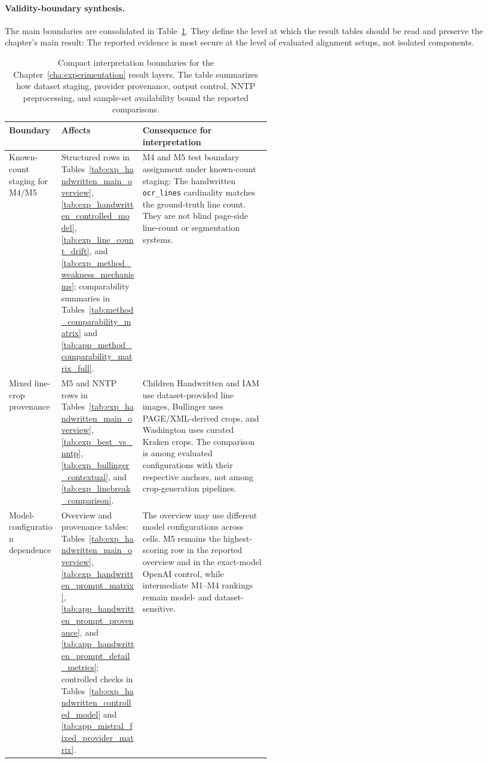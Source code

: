 \paragraph{Validity-boundary synthesis.}
The main boundaries are consolidated in Table~\ref{tab:exp_validity_boundaries}. They define the level at which the result tables should be read and preserve the chapter's main result: The reported evidence is most secure at the level of evaluated alignment setups, not isolated components.

\begin{table}[!htbp]
  \centering
  \caption{Compact interpretation boundaries for the Chapter~\ref{cha:experimentation} result layers. The table summarizes how dataset staging, provider provenance, output control, NNTP preprocessing, and sample-set availability bound the reported comparisons.}
  \label{tab:exp_validity_boundaries}
  \scriptsize
  \renewcommand{\arraystretch}{1.12}
  \setlength{\tabcolsep}{2.5pt}
  \begin{tabularx}{\linewidth}{@{}>{\raggedright\arraybackslash}p{0.20\linewidth}>{\raggedright\arraybackslash}p{0.31\linewidth}X@{}}
    \toprule
    \textbf{Boundary} & \textbf{Affects} & \textbf{Consequence for interpretation} \\
    \midrule
    Known-count staging for M4/M5 & Structured rows in Tables~\ref{tab:exp_handwritten_main_overview}, \ref{tab:exp_handwritten_controlled_model}, \ref{tab:exp_line_count_drift}, and \ref{tab:exp_method_weakness_mechanisms}; comparability summaries in Tables~\ref{tab:method_comparability_matrix} and \ref{tab:app_method_comparability_matrix_full}. & M4 and M5 test boundary assignment under known-count staging: The handwritten \texttt{ocr\_lines} cardinality matches the ground-truth line count. They are not blind page-side line-count or segmentation systems. \\
    \addlinespace[0.35em]
    Mixed line-crop provenance & M5 and NNTP rows in Tables~\ref{tab:exp_handwritten_main_overview}, \ref{tab:exp_best_vs_nntp}, \ref{tab:exp_bullinger_contextual}, and \ref{tab:exp_linebreak_comparison}. & Children Handwritten and IAM use dataset-provided line images, Bullinger uses PAGE/XML-derived crops, and Washington uses curated Kraken crops. The comparison is among evaluated configurations with their respective anchors, not among crop-generation pipelines. \\
    \addlinespace[0.35em]
    Model-configuration dependence & Overview and provenance tables: Tables~\ref{tab:exp_handwritten_main_overview}, \ref{tab:exp_handwritten_prompt_matrix}, \ref{tab:app_handwritten_prompt_provenance}, and \ref{tab:app_handwritten_prompt_detail_metrics}; controlled checks in Tables~\ref{tab:exp_handwritten_controlled_model} and \ref{tab:app_mistral_fixed_provider_matrix}. & The overview may use different model configurations across cells. M5 remains the highest-scoring row in the reported overview and in the exact-model OpenAI control, while intermediate M1--M4 rankings remain model- and dataset-sensitive. \\

\end{tabularx}
\end{table}
